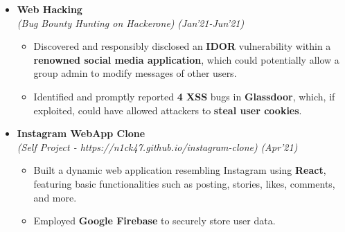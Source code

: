 \documentclass[a4paper,10pt]{article}
\newcommand{\resheading}[1]{{\small \colorbox{mygrey}{\begin{minipage}{0.99\textwidth}{\textbf{#1 \vphantom{p\^{E}}}}\end{minipage}}}}
\begin{document}
\begin{itemize}[noitemsep,nolistsep]
\setlength\itemsep{0.3cm}

\item \textbf{Web Hacking}\\
\emph{(Bug Bounty Hunting on Hackerone)} \hfill \emph{(Jan'21-Jun'21)}
	\begin{itemize}[noitemsep]
	\item Discovered and responsibly disclosed an \textbf{IDOR} vulnerability within a \textbf{renowned social media application}, which could potentially allow a group admin to modify messages of other users.
    \item Identified and promptly reported \textbf{4 XSS} bugs in \textbf{Glassdoor}, which, if exploited, could have allowed attackers to \textbf{steal user cookies}.
    \end{itemize}
\item \textbf{Instagram WebApp Clone}\\
\emph{(Self Project - https://n1ck47.github.io/instagram-clone)} \hfill \emph{(Apr'21)}
	\begin{itemize}[noitemsep]
	\item Built a dynamic web application resembling Instagram using \textbf{React}, featuring basic functionalities such as posting, stories, likes, comments, and more.
    \item Employed \textbf{Google Firebase} to securely store user data. 
    \end{itemize}

\end{itemize}	
\resheading{}\\
\end{document}
